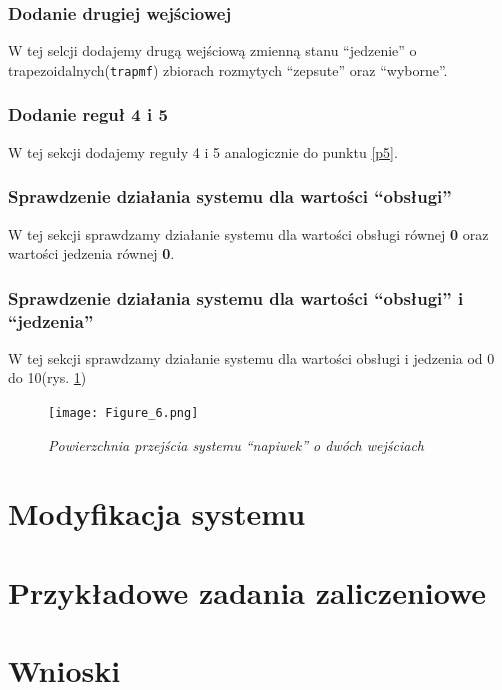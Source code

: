 \documentclass[a4paper, 10pt]{article}
\begin{document}
\subsubsection{Dodanie drugiej wejściowej}\label{p9}
 
W tej selcji dodajemy drugą wejściową zmienną stanu ``jedzenie'' o trapezoidalnych(\verb|trapmf|) zbiorach rozmytych ``zepsute'' oraz ``wyborne''.



\subsubsection{Dodanie reguł 4 i 5}\label{p10}

W tej sekcji dodajemy reguły 4 i 5 analogicznie do punktu \ref{p5}.
\subsubsection{Sprawdzenie działania systemu dla wartości ``obsługi''}\label{p11}

W tej sekcji sprawdzamy działanie systemu dla wartości obsługi równej \textbf{0} oraz wartości jedzenia równej \textbf{0}.

\subsubsection{Sprawdzenie działania systemu dla wartości ``obsługi'' i ``jedzenia''}\label{p12}

W tej sekcji sprawdzamy działanie systemu dla wartości obsługi i jedzenia od 0 do 10(rys. \ref{fig:napiwek_obsluga_jedzenie})

\begin{figure}[H]
	\centering
	\texttt{[image: Figure\_6.png]}
	\caption{\textit{Powierzchnia przejścia systemu ``napiwek'' o dwóch wejściach}}
	\label{fig:napiwek_obsluga_jedzenie}
\end{figure}


\section{Modyfikacja systemu}\label{sec:c2}

\section{Przykładowe zadania zaliczeniowe}\label{sec:c3}
 
\section{Wnioski}
\end{document}
